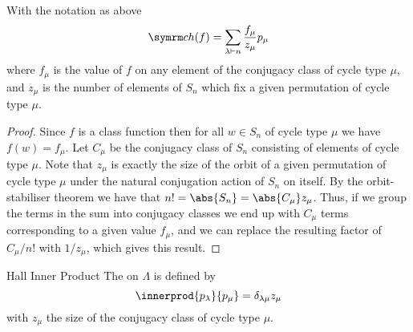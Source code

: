 \begin{lma}{}{}
    With the notation as above
    \begin{equation}
        \ch(f) = \sum_{\lambda \partition n} \frac{f_\mu}{z_\mu} p_\mu
    \end{equation}
    where \(f_\mu\) is the value of \(f\) on any element of the conjugacy class of cycle type \(\mu\), and \(z_\mu\) is the number of elements of \(S_n\) which fix a given permutation of cycle type \(\mu\).
    \begin{proof}
        Since \(f\) is a class function then for all \(w \in S_n\) of cycle type \(\mu\) we have \(f(w) = f_\mu\).
        Let \(C_\mu\) be the conjugacy class of \(S_n\) consisting of elements of cycle type \(\mu\).
        Note that \(z_\mu\) is exactly the size of the orbit of a given permutation of cycle type \(\mu\) under the natural conjugation action of \(S_n\) on itself.
        By the orbit-stabiliser theorem we have that \(n! = \abs{S_n} = \abs{C_\mu} z_\mu\).
        Thus, if we group the terms in the sum into conjugacy classes we end up with \(C_\mu\) terms corresponding to a given value \(f_\mu\), and we can replace the resulting factor of \(C_\mu/n!\) with \(1/z_\mu\), which gives this result.
    \end{proof}
\end{lma}

\begin{dfn}{Hall Inner Product}{}
    The  on \(\Lambda\) is defined by
    \begin{equation}
        \innerprod{p_\lambda}{p_\mu} = \delta_{\lambda\mu} z_\mu
    \end{equation}
    with \(z_\mu\) the size of the conjugacy class of cycle type \(\mu\).
\end{dfn}

